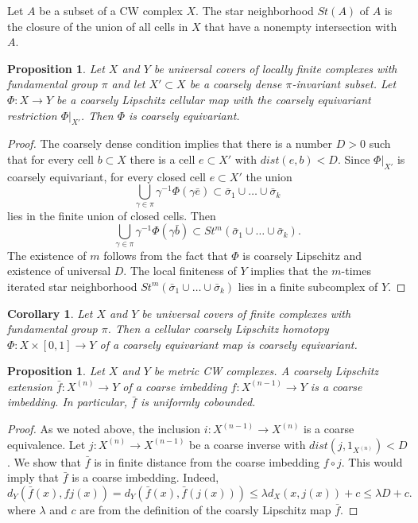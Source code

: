 \documentclass[12pt]{amsart}
\theoremstyle{plain}
\newtheorem{prop}[thm]{Proposition}
\newtheorem{cor}[thm]{Corollary}
\theoremstyle{definition}
\begin{document}
Let $A$ be a subset of a CW complex $X$. The star neighborhood
$St(A)$ of $A$ is the closure of the union of all cells in $X$ that
have a nonempty intersection with $A$. 
\begin{prop}\label{3.3} Let $X$ and $Y$ be universal covers of locally
finite complexes with fundamental group $\pi$ and let $X'\subset X$
be a coarsely dense $\pi$-invariant subset. Let $\Phi:X\to Y$ be a
coarsely Lipschitz cellular map with the coarsely equivariant
restriction $\Phi|_{X'}$. Then $\Phi$ is coarsely equivariant.
\end{prop}
\begin{proof} The coarsely dense condition implies that there is a number $D>0$
such that for every cell $b\subset X$ there is a cell $e\subset X'$
with $dist(e,b)<D$. Since $\Phi|_{X'}$ is coarsely equivariant, for
every closed cell $e\subset X'$ the union
$$\bigcup_{\gamma\in\pi}\gamma^{-1}\Phi(\gamma\bar e)\subset
\bar\sigma_1\cup\dots\cup\bar\sigma_k$$ lies in the finite union of
closed cells. Then
$$\bigcup_{\gamma\in\pi}\gamma^{-1}\Phi(\gamma\bar b)\subset
St^m(\bar\sigma_1\cup\dots\cup\bar\sigma_k).$$  The existence of $m$
follows from the fact that $\Phi$ is coarsely Lipschitz and
existence of universal $D$. The local finiteness of $Y$ implies that
the $m$-times iterated star neighborhood
$St^m(\bar\sigma_1\cup\dots\cup\bar\sigma_k)$ lies in a finite subcomplex
of $Y$.
\end{proof}
\begin{cor}\label{uniform=almost} Let $X$ and $Y$ be universal covers of
finite complexes with fundamental group $\pi$.  Then a cellular
coarsely Lipschitz homotopy $\Phi:X\times[0,1]\to Y$ of a coarsely
equivariant map is coarsely equivariant.
\end{cor}

\begin{prop}\label{coarse imb} Let $X$ and $Y$ be metric CW complexes.
A coarsely Lipschitz extension $\bar f:X^{(n)}\to Y$ of
a coarse imbedding $f:X^{(n-1)}\to Y$ is a coarse imbedding. In particular, $\bar f$ is uniformly cobounded.
\end{prop}
\begin{proof} 
As we noted above, the inclusion $i:X^{(n-1)}\to X^{(n)}$ is a coarse equivalence. Let $j:X^{(n)}\to X^{(n-1)}$ be a coarse inverse
with $dist(j, 1_{X^{(n)}})<D$.
We show that $\bar f$ is in finite distance from the coarse imbedding $f\circ j$. This would imply that $\bar f$ is a coarse imbedding.
Indeed, 
$$
d_Y(\bar f(x),fj(x))=d_Y(\bar f(x),\bar f(j(x)))\le\lambda d_X(x,j(x))+c\le\lambda D+c.
$$
where $\lambda$ and $c$ are from the definition of the coarsly Lipschitz map $\bar f$.
\end{proof}
\end{document}
